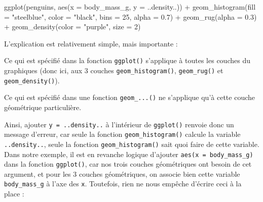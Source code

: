 \documentclass[
  letterpaper,
  DIV=11,
  numbers=noendperiod]{scrreprt}
\newenvironment{Shaded}{\begin{snugshade}}{\end{snugshade}}
\newcommand{\AttributeTok}[1]{\textcolor[rgb]{0.40,0.45,0.13}{#1}}
\newcommand{\DecValTok}[1]{\textcolor[rgb]{0.68,0.00,0.00}{#1}}
\newcommand{\FloatTok}[1]{\textcolor[rgb]{0.68,0.00,0.00}{#1}}
\newcommand{\FunctionTok}[1]{\textcolor[rgb]{0.28,0.35,0.67}{#1}}
\newcommand{\NormalTok}[1]{\textcolor[rgb]{0.00,0.23,0.31}{#1}}
\newcommand{\SpecialCharTok}[1]{\textcolor[rgb]{0.37,0.37,0.37}{#1}}
\newcommand{\StringTok}[1]{\textcolor[rgb]{0.13,0.47,0.30}{#1}}
\begin{document}
\begin{Shaded}
\begin{Highlighting}[]
\FunctionTok{ggplot}\NormalTok{(penguins, }\FunctionTok{aes}\NormalTok{(}\AttributeTok{x =}\NormalTok{ body\_mass\_g, }\AttributeTok{y =}\NormalTok{ ..density..)) }\SpecialCharTok{+}
  \FunctionTok{geom\_histogram}\NormalTok{(}\AttributeTok{fill =} \StringTok{"steelblue"}\NormalTok{, }\AttributeTok{color =} \StringTok{"black"}\NormalTok{,}
                 \AttributeTok{bins =} \DecValTok{25}\NormalTok{, }\AttributeTok{alpha =} \FloatTok{0.7}\NormalTok{) }\SpecialCharTok{+}
  \FunctionTok{geom\_rug}\NormalTok{(}\AttributeTok{alpha =} \FloatTok{0.3}\NormalTok{) }\SpecialCharTok{+}
  \FunctionTok{geom\_density}\NormalTok{(}\AttributeTok{color =} \StringTok{"purple"}\NormalTok{, }\AttributeTok{size =} \DecValTok{2}\NormalTok{)}
\end{Highlighting}
\end{Shaded}

L'explication est relativement simple, mais importante :

\begin{tcolorbox}[enhanced jigsaw, bottomtitle=1mm, title=\textcolor{quarto-callout-important-color}{\faExclamation}\hspace{0.5em}{Important}, breakable, opacitybacktitle=0.6, coltitle=black, opacityback=0, toprule=.15mm, toptitle=1mm, titlerule=0mm, colback=white, rightrule=.15mm, arc=.35mm, leftrule=.75mm, bottomrule=.15mm, left=2mm, colframe=quarto-callout-important-color-frame, colbacktitle=quarto-callout-important-color!10!white]
Ce qui est spécifié dans la fonction \texttt{ggplot()} s'applique à
toutes les couches du graphiques (donc ici, aux 3 couches
\texttt{geom\_histogram()}, \texttt{geom\_rug()} et
\texttt{geom\_density()}).

Ce qui est spécifié dans une fonction \texttt{geom\_...()} ne s'applique
qu'à cette couche géométrique particulière.
\end{tcolorbox}

Ainsi, ajouter \texttt{y\ =\ ..density..} à l'intérieur de
\texttt{ggplot()} renvoie donc un message d'erreur, car seule la
fonction \texttt{geom\_histogram()} calcule la variable
\texttt{..density..}, seule la fonction \texttt{geom\_histogram()} sait
quoi faire de cette variable. Dans notre exemple, il est en revanche
logique d'ajouter \texttt{aes(x\ =\ body\_mass\_g)} dans la fonction
\texttt{ggplot()}, car nos trois couches géométriques ont besoin de cet
argument, et pour les 3 couches géométriques, on associe bien cette
variable \texttt{body\_mass\_g} à l'axe des \texttt{x}. Toutefois, rien
ne nous empêche d'écrire ceci à la place :
\end{document}
